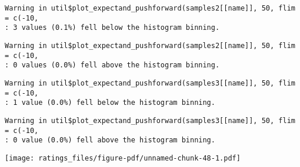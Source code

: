 \documentclass[
  letterpaper,
  DIV=11,
  numbers=noendperiod]{scrartcl}
\newenvironment{Shaded}{\begin{snugshade}}{\end{snugshade}}
\newcommand{\AttributeTok}[1]{\textcolor[rgb]{0.40,0.45,0.13}{#1}}
\newcommand{\ConstantTok}[1]{\textcolor[rgb]{0.56,0.35,0.01}{#1}}
\newcommand{\DecValTok}[1]{\textcolor[rgb]{0.68,0.00,0.00}{#1}}
\newcommand{\FunctionTok}[1]{\textcolor[rgb]{0.28,0.35,0.67}{#1}}
\newcommand{\NormalTok}[1]{\textcolor[rgb]{0.00,0.23,0.31}{#1}}
\newcommand{\OtherTok}[1]{\textcolor[rgb]{0.00,0.23,0.31}{#1}}
\newcommand{\SpecialCharTok}[1]{\textcolor[rgb]{0.37,0.37,0.37}{#1}}
\newcommand{\StringTok}[1]{\textcolor[rgb]{0.13,0.47,0.30}{#1}}
\begin{document}
\begin{Shaded}
\end{Shaded}

\begin{verbatim}
Warning in util$plot_expectand_pushforward(samples2[[name]], 50, flim = c(-10,
: 3 values (0.1%) fell below the histogram binning.
\end{verbatim}

\begin{verbatim}
Warning in util$plot_expectand_pushforward(samples2[[name]], 50, flim = c(-10,
: 0 values (0.0%) fell above the histogram binning.
\end{verbatim}

\begin{verbatim}
Warning in util$plot_expectand_pushforward(samples3[[name]], 50, flim = c(-10,
: 1 value (0.0%) fell below the histogram binning.
\end{verbatim}

\begin{verbatim}
Warning in util$plot_expectand_pushforward(samples3[[name]], 50, flim = c(-10,
: 0 value (0.0%) fell above the histogram binning.
\end{verbatim}

\texttt{[image: ratings\_files/figure-pdf/unnamed-chunk-48-1.pdf]}
\end{document}
